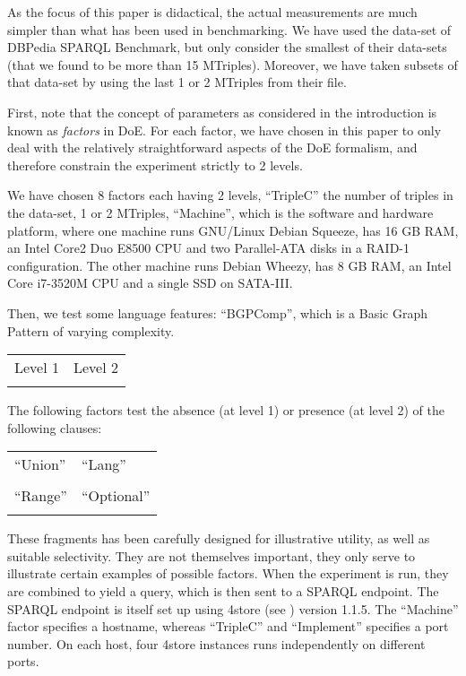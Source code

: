 \documentclass{llncs}
\begin{document}
As the focus of this paper is didactical, the actual measurements are
much simpler than what has been used in benchmarking. We have used the
data-set of DBPedia SPARQL Benchmark\cite{mxro:Morsey2011DBpedia}, but
only consider the smallest of their data-sets (that we found to be
more than 15 MTriples). Moreover, we have taken subsets of that
data-set by using the last 1 or 2 MTriples from their file.

First, note that the concept of parameters as considered in the
introduction is known as \emph{factors} in DoE. For each factor, we
have chosen in this paper to only deal with the relatively
straightforward aspects of the DoE formalism, and therefore constrain
the experiment strictly to 2 levels.

We have chosen 8 factors each having 2 levels, ``TripleC'' the number
of triples in the data-set, 1 or 2 MTriples, ``Machine'', which is the
software and hardware platform, where one machine runs GNU/Linux
Debian Squeeze, has 16 GB RAM, an Intel Core2 Duo E8500 CPU and two
Parallel-ATA disks in a RAID-1 configuration. The other machine runs
Debian Wheezy, has 8 GB RAM, an Intel Core i7-3520M CPU and a single
SSD on SATA-III.

Then, we test some language features: ``BGPComp'', which is a Basic
Graph Pattern of varying complexity. 

\begin{tabular}{p{}p{}}
Level 1 & Level 2 \\ 
 &  \\
\end{tabular}

The following factors test the absence (at level 1) or presence (at
level 2) of the following clauses:

\begin{tabular}{p{}p{}}

``Union'' & ``Lang'' \\
 &
 \\

``Range'' & ``Optional'' \\
 & 

\end{tabular}

These fragments has been carefully designed for illustrative utility,
as well as suitable selectivity. They are not themselves important,
they only serve to illustrate certain examples of possible
factors. When the experiment is run, they are combined to yield a
query, which is then sent to a SPARQL endpoint. The SPARQL endpoint is
itself set up using 4store (see \cite{harris20094store}) version
1.1.5. The ``Machine'' factor specifies a hostname, whereas
``TripleC'' and ``Implement'' specifies a port number. On each host,
four 4store instances runs independently on different ports. 
\end{document}

